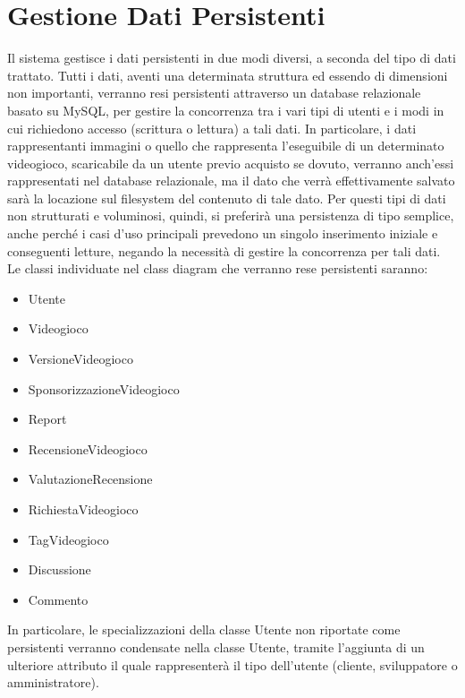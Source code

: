 \section{Gestione Dati Persistenti}
Il sistema gestisce i dati persistenti in due modi diversi, a seconda del tipo di dati trattato. Tutti i dati, aventi una determinata struttura ed essendo di dimensioni non importanti, verranno resi persistenti attraverso un database relazionale basato su MySQL, per gestire la concorrenza tra i vari tipi di utenti e i modi in cui richiedono accesso (scrittura o lettura) a tali dati. In particolare, i dati rappresentanti immagini o quello che rappresenta l’eseguibile di un determinato videogioco, scaricabile da un utente previo acquisto se dovuto, verranno anch’essi rappresentati nel database relazionale, ma il dato che verrà effettivamente salvato sarà la locazione sul filesystem del contenuto di tale dato. Per questi tipi di dati non strutturati e voluminosi, quindi, si preferirà una persistenza di tipo semplice, anche perché i casi d’uso principali prevedono un singolo inserimento iniziale e conseguenti letture, negando la necessità di gestire la concorrenza per tali dati.\\
Le classi individuate nel class diagram che verranno rese persistenti saranno:
\begin{itemize}
	\item Utente
	\item Videogioco
	\item VersioneVideogioco
	\item SponsorizzazioneVideogioco
	\item Report
	\item RecensioneVideogioco
	\item ValutazioneRecensione
	\item RichiestaVideogioco
	\item TagVideogioco
	\item Discussione
	\item Commento
\end{itemize}
In particolare, le specializzazioni della classe Utente non riportate come persistenti verranno condensate nella classe Utente, tramite l’aggiunta di un ulteriore attributo il quale rappresenterà il tipo dell’utente (cliente, sviluppatore o amministratore).

